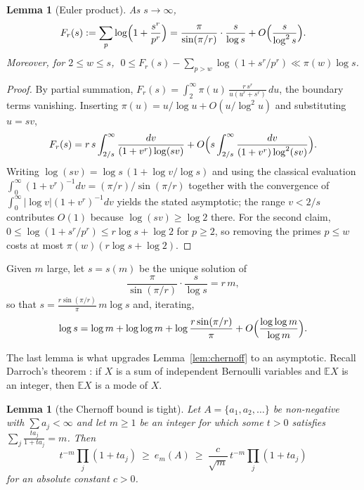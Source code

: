 \documentclass[11pt,reqno]{amsart}
\theoremstyle{plain}
\newtheorem{lemma}[theorem]{Lemma}
\theoremstyle{definition}
\numberwithin{equation}{section}
\begin{document}
\begin{lemma}[Euler product]\label{lem:euler}
As $s\to\infty$,
\[
  F_r(s):=\sum_{p}\log\Bigl(1+\frac{s^{r}}{p^{r}}\Bigr)
  =\frac{\pi}{\sin(\pi/r)}\cdot\frac{s}{\log s}+O\Bigl(\frac{s}{\log^{2}s}\Bigr).
\]
Moreover, for $2\le w\le s$, $\;0\le F_r(s)-\sum_{p>w}\log(1+s^{r}/p^{r})\ll\pi(w)\log s$.
\end{lemma}

\begin{proof}
By partial summation, $F_r(s)=\int_{2}^{\infty}\pi(u)\,\frac{r\,s^{r}}{u(u^{r}+s^{r})}\,du$,
the boundary terms vanishing. Inserting $\pi(u)=u/\log u+O(u/\log^{2}u)$ and substituting
$u=sv$,
\[
  F_r(s)=r\,s\int_{2/s}^{\infty}\frac{dv}{(1+v^{r})\log(sv)}
  +O\Bigl(s\int_{2/s}^{\infty}\frac{dv}{(1+v^{r})\log^{2}(sv)}\Bigr).
\]
Writing $\log(sv)=\log s\,(1+\log v/\log s)$ and using the classical evaluation
$\int_0^{\infty}(1+v^{r})^{-1}dv=(\pi/r)/\sin(\pi/r)$ together with the convergence of
$\int_0^{\infty}|\log v|(1+v^{r})^{-1}dv$ yields the stated asymptotic; the range
$v<2/s$ contributes $O(1)$ because $\log(sv)\ge\log2$ there. For the second claim,
$0\le\log(1+s^{r}/p^{r})\le r\log s+\log2$ for $p\ge2$, so removing the primes $p\le w$
costs at most $\pi(w)(r\log s+\log2)$.
\end{proof}

Given $m$ large, let $s=s(m)$ be the unique solution of
\begin{equation}\label{eq:saddle}
  \frac{\pi}{\sin(\pi/r)}\cdot\frac{s}{\log s}=r\,m ,
\end{equation}
so that $s=\frac{r\sin(\pi/r)}{\pi}\,m\log s$ and, iterating,
\begin{equation}\label{eq:logs}
  \log s=\log m+\log\log m+\log\frac{r\sin(\pi/r)}{\pi}+O\Bigl(\frac{\log\log m}{\log m}\Bigr).
\end{equation}

The last lemma is what upgrades Lemma~\ref{lem:chernoff} to an asymptotic. Recall
Darroch's theorem \cite{Darroch}: if $X$ is a sum of independent Bernoulli variables and
$\mathbb E X$ is an integer, then $\mathbb E X$ is a mode of $X$.

\begin{lemma}[the Chernoff bound is tight]\label{lem:local}
Let $A=\{a_1,a_2,\dots\}$ be non-negative with $\sum a_j<\infty$ and let $m\ge1$ be an
integer for which some $t>0$ satisfies $\sum_j\frac{ta_j}{1+ta_j}=m$. Then
\[
  t^{-m}\prod_j(1+ta_j)\ \ge\ e_m(A)\ \ge\ \frac{c}{\sqrt m}\,t^{-m}\prod_j(1+ta_j)
\]
for an absolute constant $c>0$.
\end{lemma}
\end{document}
